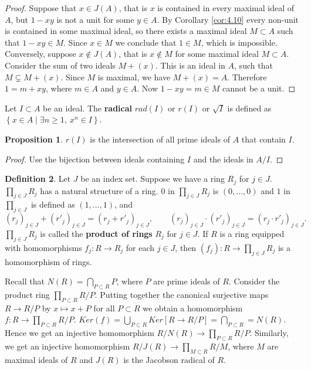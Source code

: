 \documentclass{article}
\newcommand{\rb}[1]{\left( #1 \right)}
\renewcommand{\sb}[1]{\left[ #1 \right]}
\newcommand{\cb}[1]{\left\{ #1 \right\}}
\theoremstyle{definition}\newtheorem{definition}{Definition}[section]
\theoremstyle{definition}\newtheorem{remark}[definition]{Remark}
\theoremstyle{definition}\newtheorem*{example}{Example}
\theoremstyle{definition}\newtheorem*{note}{Note}
\newtheorem{proposition}[definition]{Proposition}
\begin{document}
\begin{proof}
Suppose that $ x \in J\rb{A} $, that is $ x $ is contained in every maximal ideal of $ A $, but $ 1 - xy $ is not a unit for some $ y \in A $. By Corollary \ref{cor:4.10} every non-unit is contained in some maximal ideal, so there exists a maximal ideal $ M \subset A $ such that $ 1 - xy \in M $. Since $ x \in M $ we conclude that $ 1 \in M $, which is impossible. Conversely, suppose $ x \notin J\rb{A} $, that is $ x \notin M $ for some maximal ideal $ M \subset A $. Consider the sum of two ideals $ M + \rb{x} $. This is an ideal in $ A $, such that $ M \subsetneq M + \rb{x} $. Since $ M $ is maximal, we have $ M + \rb{x} = A $. Therefore $ 1 = m + xy $, where $ m \in A $ and $ y \in A $. Now $ 1 - xy = m \in M $ cannot be a unit.
\end{proof}

Let $ I \subset A $ be an ideal. The \textbf{radical} $ rad\rb{I} $ or $ r\rb{I} $ or $ \sqrt{I} $ is defined as $ \cb{x \in A \mid \exists n \ge 1, \ x^n \in I} $.

\begin{proposition}
$ r\rb{I} $ is the intersection of all prime ideals of $ A $ that contain $ I $.
\end{proposition}

\begin{proof}
Use the bijection between ideals containing $ I $ and the ideals in $ A / I $.
\end{proof}


\begin{definition}
Let $ J $ be an index set. Suppose we have a ring $ R_j $ for $ j \in J $. $ \prod_{j \in J} R_j $ has a natural structure of a ring. $ 0 $ in $ \prod_{j \in J} R_j $ is $ \rb{0, \dots, 0} $ and $ 1 $ in $ \prod_{j \in J} $ is defined as $ \rb{1, \dots, 1} $, and
$$ \rb{r_j}_{j \in J} + \rb{r'_j}_{j \in J} = \rb{r_j + r'_j}_{j \in J}, \qquad \rb{r_j}_{j \in J} \cdot \rb{r'_j}_{j \in J} = \rb{r_j \cdot r'_j}_{j \in J}. $$
$ \prod_{j \in J} R_j $ is called the \textbf{product of rings} $ R_j $ for $ j \in J $. If $ R $ is a ring equipped with homomorphisms $ f_j : R \to R_j $ for each $ j \in J $, then $ \rb{f_j} : R \to \prod_{j \in J} R_j $ is a homomorphism of rings.
\end{definition}

Recall that $ N\rb{R} = \bigcap_{P \subset R} P $, where $ P $ are prime ideals of $ R $. Consider the product ring $ \prod_{P \subset R} R / P $. Putting together the canonical surjective maps $ R \to R / P $ by $ x \mapsto x + P $ for all $ P \subset R $ we obtain a homomorphism $ f : R \to \prod_{P \subset R} R / P $. $ Ker\rb{f} = \bigcup_{P \subset R} Ker\sb{R \to R / P} = \bigcap_{P \subset R} = N\rb{R} $. Hence we get an injective homomorphism $ R / N\rb{R} \to \prod_{P \subset R} R / P $. Similarly, we get an injective homomorphism $ R / J\rb{R} \to \prod_{M \subset R} R / M $, where $ M $ are maximal ideals of $ R $ and $ J\rb{R} $ is the Jacobson radical of $ R $.
\end{document}
